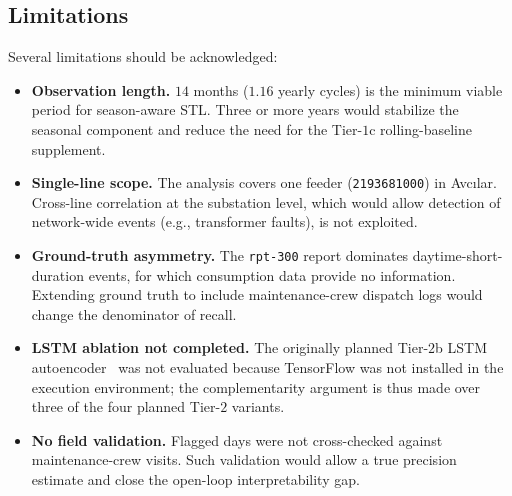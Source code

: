 \documentclass[11pt]{article}
\begin{document}
\begin{enumerate}[leftmargin=1.5em,itemsep=1pt]
\section{Limitations}\label{sec:limitations}
Several limitations should be acknowledged:

\begin{itemize}[leftmargin=1.5em,itemsep=2pt]
  \item \textbf{Observation length.} $14$ months ($1.16$ yearly cycles) is the minimum viable period for season-aware STL. Three or more years would stabilize the seasonal component and reduce the need for the Tier-$1$c rolling-baseline supplement.

  \item \textbf{Single-line scope.} The analysis covers one feeder (\texttt{2193681000}) in Avc{\i}lar. Cross-line correlation at the substation level, which would allow detection of network-wide events (e.g., transformer faults), is not exploited.

  \item \textbf{Ground-truth asymmetry.} The \texttt{rpt-300} report dominates daytime-short-duration events, for which consumption data provide no information. Extending ground truth to include maintenance-crew dispatch logs would change the denominator of recall.

  \item \textbf{LSTM ablation not completed.} The originally planned Tier-$2$b LSTM autoencoder~\cite{malhotra2016lstm} was not evaluated because TensorFlow was not installed in the execution environment; the complementarity argument is thus made over three of the four planned Tier-$2$ variants.

  \item \textbf{No field validation.} Flagged days were not cross-checked against maintenance-crew visits. Such validation would allow a true precision estimate and close the open-loop interpretability gap.
\end{itemize}


\end{enumerate}
\end{document}
